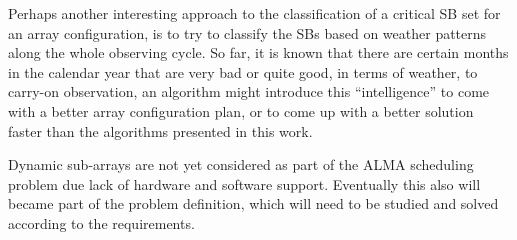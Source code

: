 Perhaps another interesting approach to the classification of a critical SB set for an array configuration, is to try to classify the SBs based on weather patterns along the whole observing cycle. So far, it is known that there are certain months in the calendar year that are very bad or quite good, in terms of weather, to carry-on observation, an algorithm might introduce this ``intelligence'' to come with a better array configuration plan, or to come up with a better solution faster than the algorithms presented in this work.

Dynamic sub-arrays are not yet considered as part of the ALMA scheduling problem due lack of hardware and software support. Eventually this also will became part of the problem definition, which will need to be studied and solved according to the requirements. 
